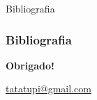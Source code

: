\documentclass{beamer}
\begin{document}


{
\begin{frame}{Bibliografia}
\frametitle{Bibliografia}

\end{frame}
\addtocounter{framenumber}{-1}
}

{
%
\begin{frame}
\centering
\Large
\textbf{Obrigado!}

\vspace{1cm}
\normalsize
\href{tatatupi@gmail.com}{tatatupi@gmail.com}

\end{frame}
\addtocounter{framenumber}{-1}

}
\end{document}
